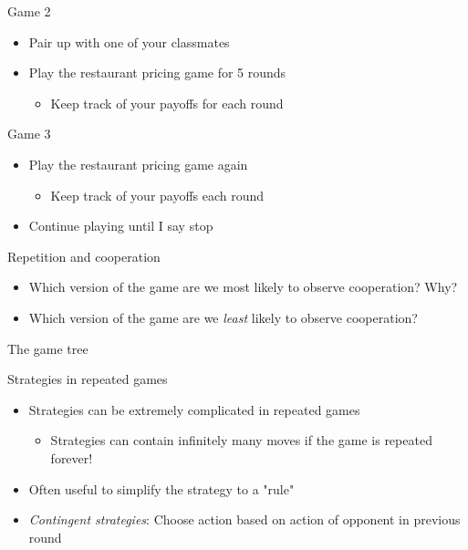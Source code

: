 \documentclass[10pt]{beamer}
\begin{document}
\begin{frame}[label={sec:org6648943}]{}
\alert{Game 2}
\begin{itemize}
\item Pair up with one of your classmates
\item Play the restaurant pricing game for 5 rounds
\begin{itemize}
\item Keep track of your payoffs for each round
\end{itemize}
\end{itemize}
\end{frame}

\begin{frame}[label={sec:org8f3e027}]{}
\alert{Game 3}
\begin{itemize}
\item Play the restaurant pricing game again
\begin{itemize}
\item Keep track of your payoffs each round
\end{itemize}
\item Continue playing until I say stop
\end{itemize}
\end{frame}

\begin{frame}[label={sec:orgbed9a7b}]{}
\alert{Repetition and cooperation}
\begin{itemize}
\item Which version of the game are we most likely to observe cooperation? Why?
\item Which version of the game are we \emph{least} likely to observe cooperation?
\end{itemize}
\end{frame}

\begin{frame}[label={sec:orgade0f03}]{The game tree}
\end{frame}

\begin{frame}[label={sec:orgee8a9f9}]{}
\alert{Strategies in repeated games}
\begin{itemize}
\item Strategies can be extremely complicated in repeated games 
\begin{itemize}
\item Strategies can contain infinitely many moves if the game is repeated forever!
\end{itemize}
\item Often useful to simplify the strategy to a "rule"
\item \emph{Contingent strategies}: Choose action based on action of opponent in previous round
\end{itemize}
\end{frame}
\end{document}
